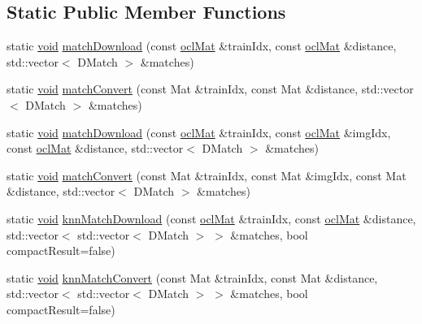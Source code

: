 \subsection*{Static Public Member Functions}
\begin{DoxyCompactItemize}
\item 
static \hyperlink{legacy_8hpp_a8bb47f092d473522721002c86c13b94e}{void} \hyperlink{classcv_1_1ocl_1_1BruteForceMatcher__OCL__base_af70393abadc1bf8c3f3857050e79f531}{match\-Download} (const \hyperlink{classcv_1_1ocl_1_1oclMat}{ocl\-Mat} \&train\-Idx, const \hyperlink{classcv_1_1ocl_1_1oclMat}{ocl\-Mat} \&distance, std\-::vector$<$ D\-Match $>$ \&matches)
\item 
static \hyperlink{legacy_8hpp_a8bb47f092d473522721002c86c13b94e}{void} \hyperlink{classcv_1_1ocl_1_1BruteForceMatcher__OCL__base_a0b140f6266bcfd8279db5a01f7fc2d57}{match\-Convert} (const Mat \&train\-Idx, const Mat \&distance, std\-::vector$<$ D\-Match $>$ \&matches)
\item 
static \hyperlink{legacy_8hpp_a8bb47f092d473522721002c86c13b94e}{void} \hyperlink{classcv_1_1ocl_1_1BruteForceMatcher__OCL__base_af50434a072371e695988aa63eb7d70ee}{match\-Download} (const \hyperlink{classcv_1_1ocl_1_1oclMat}{ocl\-Mat} \&train\-Idx, const \hyperlink{classcv_1_1ocl_1_1oclMat}{ocl\-Mat} \&img\-Idx, const \hyperlink{classcv_1_1ocl_1_1oclMat}{ocl\-Mat} \&distance, std\-::vector$<$ D\-Match $>$ \&matches)
\item 
static \hyperlink{legacy_8hpp_a8bb47f092d473522721002c86c13b94e}{void} \hyperlink{classcv_1_1ocl_1_1BruteForceMatcher__OCL__base_a007afa9401fcceacea7b07124383fc18}{match\-Convert} (const Mat \&train\-Idx, const Mat \&img\-Idx, const Mat \&distance, std\-::vector$<$ D\-Match $>$ \&matches)
\item 
static \hyperlink{legacy_8hpp_a8bb47f092d473522721002c86c13b94e}{void} \hyperlink{classcv_1_1ocl_1_1BruteForceMatcher__OCL__base_abe09dce6c71a724c10ef9b8c36d6e16f}{knn\-Match\-Download} (const \hyperlink{classcv_1_1ocl_1_1oclMat}{ocl\-Mat} \&train\-Idx, const \hyperlink{classcv_1_1ocl_1_1oclMat}{ocl\-Mat} \&distance, std\-::vector$<$ std\-::vector$<$ D\-Match $>$ $>$ \&matches, bool compact\-Result=false)
\item 
static \hyperlink{legacy_8hpp_a8bb47f092d473522721002c86c13b94e}{void} \hyperlink{classcv_1_1ocl_1_1BruteForceMatcher__OCL__base_a1462555aace96452d9b8fbb0831f004f}{knn\-Match\-Convert} (const Mat \&train\-Idx, const Mat \&distance, std\-::vector$<$ std\-::vector$<$ D\-Match $>$ $>$ \&matches, bool compact\-Result=false)

\end{DoxyCompactItemize}
